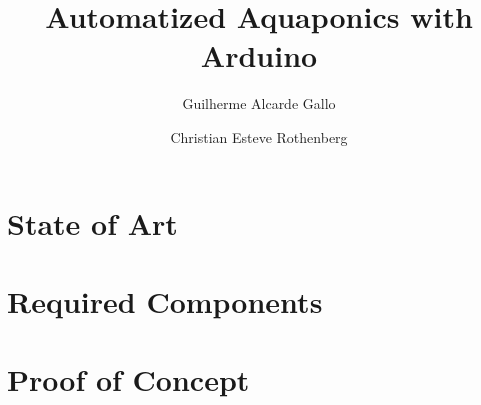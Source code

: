 \documentclass[11pt,a4paper]{article}
\title{Automatized Aquaponics with Arduino}
\author{Guilherme Alcarde Gallo \and Christian Esteve Rothenberg}
\begin{document}
\section{State of Art}
\label{sec:state_of_art}



\section{Required Components}
\label{sec:required_components}



\section{Proof of Concept}
\label{sec:proof_of_concept}



\printbibliography
\end{document}
